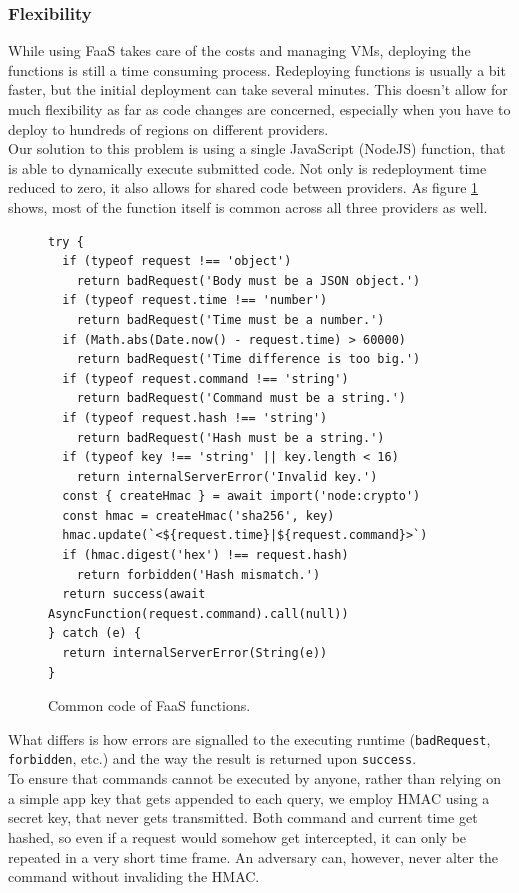 \documentclass[a4paper,bibliography=totoc]{scrartcl}
\begin{document}
\subsubsection{Flexibility}
While using FaaS takes care of the costs and managing VMs, deploying the functions is still a time consuming process. Redeploying functions is usually a bit faster, but the initial deployment can take several minutes.\cite{gcp_function_deployment} This doesn't allow for much flexibility as far as code changes are concerned, especially when you have to deploy to hundreds of regions on different providers.\\
Our solution to this problem is using a single JavaScript (NodeJS) function, that is able to dynamically execute submitted code.\cite{wb_aws_function,wb_azure_function,wb_gcp_function} Not only is redeployment time reduced to zero, it also allows for shared code between providers. As figure \ref{fig:function} shows, most of the function itself is common across all three providers as well.
\begin{figure}[!ht]
\begin{lstlisting}[style=ES6]
try {
  if (typeof request !== 'object')
    return badRequest('Body must be a JSON object.')
  if (typeof request.time !== 'number')
    return badRequest('Time must be a number.')
  if (Math.abs(Date.now() - request.time) > 60000)
    return badRequest('Time difference is too big.')
  if (typeof request.command !== 'string')
    return badRequest('Command must be a string.')
  if (typeof request.hash !== 'string')
    return badRequest('Hash must be a string.')
  if (typeof key !== 'string' || key.length < 16)
    return internalServerError('Invalid key.')
  const { createHmac } = await import('node:crypto')
  const hmac = createHmac('sha256', key)
  hmac.update(`<${request.time}|${request.command}>`)
  if (hmac.digest('hex') !== request.hash)
    return forbidden('Hash mismatch.')
  return success(await AsyncFunction(request.command).call(null))
} catch (e) {
  return internalServerError(String(e))
}
\end{lstlisting}
\caption{Common code of FaaS functions.}
\label{fig:function}
\end{figure}%
What differs is how errors are signalled to the executing runtime (\texttt{badRequest}, \texttt{forbidden}, etc.) and the way the result is returned upon \texttt{success}.\\
To ensure that commands cannot be executed by anyone, rather than relying on a simple app key that gets appended to each query,\cite{azure_functions_keys} we employ HMAC using a secret key, that never gets transmitted. Both command and current time get hashed, so even if a request would somehow get intercepted, it can only be repeated in a very short time frame. An adversary can, however, never alter the command without invaliding the HMAC.\cite{hmac}
\end{document}
